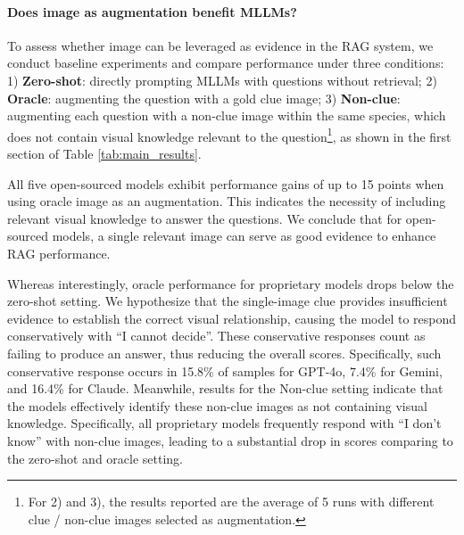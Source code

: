 
\paragraph{Does image as augmentation benefit MLLMs?} 

\noindent To assess whether image can be leveraged as evidence in the RAG system, we conduct baseline experiments and compare performance under three conditions: 1) \textbf{Zero-shot}: directly prompting MLLMs with questions without retrieval; 2) \textbf{Oracle}: augmenting the question with a gold clue image; 3) \textbf{Non-clue}: augmenting each question with a non-clue image within the same species, which does not contain visual knowledge relevant to the question\footnote{For 2) and 3), the results reported are the average of 5 runs with different clue / non-clue images selected as augmentation.}, as shown in the first section of Table \ref{tab:main_results}.

All five open-sourced models exhibit performance gains of up to 15 points when using oracle image as an augmentation. This indicates the necessity of including relevant visual knowledge to answer the questions. We conclude that for open-sourced models, a single relevant image can serve as good evidence to enhance RAG performance.

Whereas interestingly, oracle performance for proprietary models drops below the zero-shot setting. We hypothesize that the single-image clue provides insufficient evidence to establish the correct visual relationship, causing the model to respond conservatively with ``I cannot decide''. These conservative responses count as failing to produce an answer, thus reducing the overall scores. Specifically, such conservative response occurs in 15.8\% of samples for GPT-4o, 7.4\% for Gemini, and 16.4\% for Claude. Meanwhile, results for the Non-clue setting indicate that the models effectively identify these non-clue images as not containing visual knowledge. Specifically, all proprietary models frequently respond with ``I don't know'' with non-clue images, leading to a substantial drop in scores comparing to the zero-shot and oracle setting.

